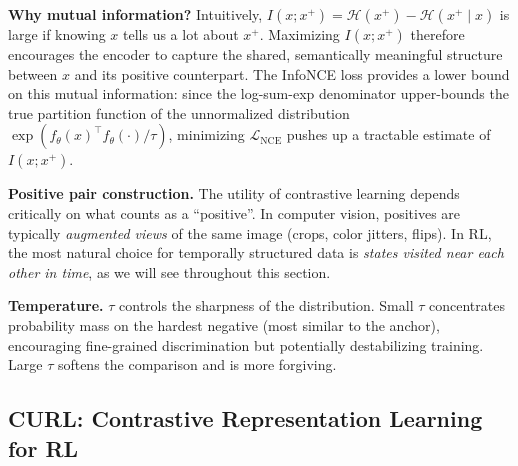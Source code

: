 \documentclass[11pt, letterpaper]{article}
\begin{document}
\begin{remark}
    \textbf{Why mutual information?} Intuitively, \(I(x; x^+) = \mathcal{H}(x^+) - \mathcal{H}(x^+ \mid x)\) is large if knowing \(x\) tells us a lot about \(x^+\). Maximizing \(I(x; x^+)\) therefore encourages the encoder to capture the shared, semantically meaningful structure between \(x\) and its positive counterpart. The InfoNCE loss provides a lower bound on this mutual information: since the log-sum-exp denominator upper-bounds the true partition function of the unnormalized distribution \(\exp(f_\theta(x)^\top f_\theta(\cdot) / \tau)\), minimizing \(\mathcal{L}_{\text{NCE}}\) pushes up a tractable estimate of \(I(x; x^+)\).
 
    \textbf{Positive pair construction.} The utility of contrastive learning depends critically on what counts as a ``positive''. In computer vision, positives are typically \textit{augmented views} of the same image (crops, color jitters, flips). In RL, the most natural choice for temporally structured data is \textit{states visited near each other in time}, as we will see throughout this section.
 
    \textbf{Temperature.} \(\tau\) controls the sharpness of the distribution. Small \(\tau\) concentrates probability mass on the hardest negative (most similar to the anchor), encouraging fine-grained discrimination but potentially destabilizing training. Large \(\tau\) softens the comparison and is more forgiving.
\end{remark}
 
\subsection{CURL: Contrastive Representation Learning for RL}
 
\end{document}
